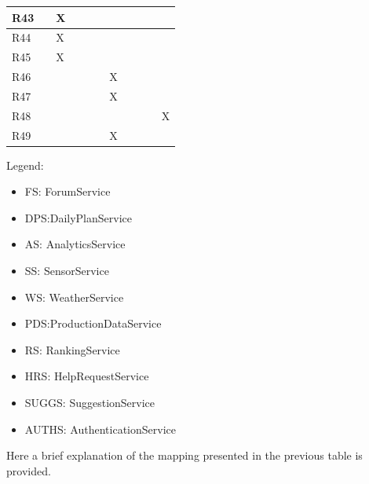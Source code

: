 \documentclass{article}
\begin{document}
\begin{longtable}[c]{|m{0.10cm}|m{0.10cm}|m{0.10cm}|m{0.10cm}|m{0.05cm}|m{0.10cm}|m{0.10cm}|m{0.10cm}|m{0.10cm}|m{0.10cm}|m{0.10cm}|}
 R43 &   & X  &   &   &   &   &  &   &   &   \\
 \hline
 R44 &   & X  &   &   &   &   &  &   &   &   \\
 \hline
 R45 &   & X  &   &   &   &   &  &   &  &    \\
 \hline
 R46 &   &   &   &   &   & X  &  &   &  &    \\
 \hline
 R47 &   &   &   &   &   & X  &  &   &  &    \\
 \hline
  R48 &   &   &   &   &   &   &  &   &  & X   \\
 \hline
  R49 &   &   &   &   &   & X  &  &   &  &    \\
 \hline
\end{longtable}

Legend:
\begin{itemize}
    \item FS: ForumService
    \item DPS:DailyPlanService
    \item AS: AnalyticsService
    \item SS: SensorService
    \item WS: WeatherService
    \item PDS:ProductionDataService
    \item RS: RankingService
    \item HRS: HelpRequestService
    \item SUGGS: SuggestionService
    \item AUTHS: AuthenticationService
\end{itemize}

Here a brief explanation of the mapping presented in the previous table is provided.
\end{document}
